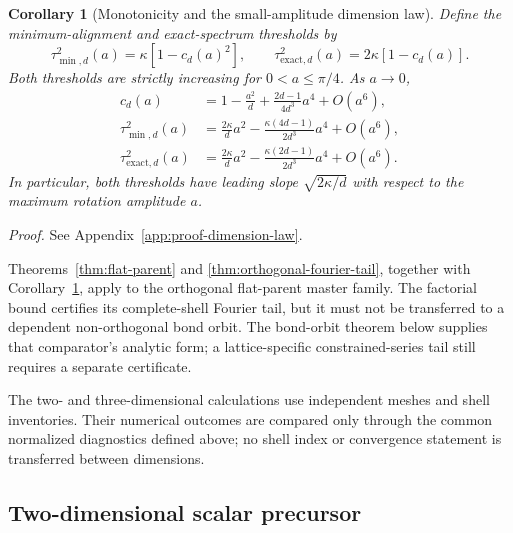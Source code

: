 \documentclass[11pt]{article}
\newtheorem{corollary}[theorem]{Corollary}
\begin{document}
\begin{corollary}[Monotonicity and the small-amplitude dimension law]
\label{cor:dimension-law}
Define the minimum-alignment and exact-spectrum thresholds by
\begin{equation}
 \tau_{\min,d}^2(a)=\kappa[1-c_d(a)^2],
 \qquad
 \tau_{\mathrm{exact},d}^2(a)=2\kappa[1-c_d(a)].
\end{equation}
Both thresholds are strictly increasing for $0<a\le\pi/4$. As $a\to0$,
\begin{align}
 c_d(a)
 &=1-\frac{a^2}{d}+\frac{2d-1}{4d^3}a^4+O(a^6),
 \label{eq:correlation-small-a}\\
 \tau_{\min,d}^2(a)
 &=\frac{2\kappa}{d}a^2
   -\frac{\kappa(4d-1)}{2d^3}a^4+O(a^6),
 \label{eq:min-threshold-small-a}\\
 \tau_{\mathrm{exact},d}^2(a)
 &=\frac{2\kappa}{d}a^2
   -\frac{\kappa(2d-1)}{2d^3}a^4+O(a^6).
 \label{eq:exact-threshold-small-a}
\end{align}
In particular, both thresholds have leading slope
$\sqrt{2\kappa/d}$ with respect to the maximum rotation amplitude $a$.
\end{corollary}

\noindent\emph{Proof.} See Appendix~\ref{app:proof-dimension-law}.


Theorems~\ref{thm:flat-parent} and \ref{thm:orthogonal-fourier-tail}, together with
Corollary~\ref{cor:dimension-law}, apply to the orthogonal flat-parent master family.
The factorial bound certifies its complete-shell Fourier tail, but it must not be
transferred to a dependent non-orthogonal bond orbit. The bond-orbit theorem below
supplies that comparator's analytic form; a lattice-specific constrained-series tail
still requires a separate certificate.

The two- and three-dimensional calculations use independent meshes and shell
inventories. Their numerical outcomes are compared only through the common normalized
diagnostics defined above; no shell index or convergence statement is transferred
between dimensions.

\subsection{Two-dimensional scalar precursor}
\end{document}
